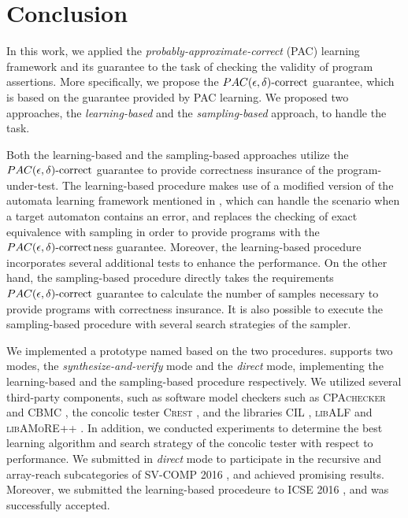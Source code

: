 \chapter{Conclusion}\label{ch:conclusion}

In this work, we applied the \emph{probably-approximate-correct} (PAC) learning framework and its guarantee to the task of checking the validity of program assertions. More specifically, we propose the $PAC(\epsilon, \delta)\text{-correct}$ guarantee, which is based on the guarantee provided by PAC learning. We proposed two approaches, the \emph{learning-based} and the \emph{sampling-based} approach, to handle the task. 

Both the learning-based and the sampling-based approaches utilize the $PAC(\epsilon, \delta)\text{-correct}$ guarantee to provide correctness insurance of the program-under-test. The learning-based procedure makes use of a modified version of the automata learning framework mentioned in \cite{Angluin87}, which can handle the scenario when a target automaton contains an error, and replaces the checking of exact equivalence with sampling in order to provide programs with the $PAC(\epsilon, \delta)\text{-correct}$ness guarantee. Moreover, the learning-based procedure incorporates several additional tests to enhance the performance. On the other hand, the sampling-based procedure directly takes the requirements $PAC(\epsilon, \delta)\text{-correct}$ guarantee to calculate the number of samples necessary to provide programs with correctness insurance. It is also possible to execute the sampling-based procedure with several search strategies of the sampler.

We implemented a prototype named \PACMAN based on the two procedures. \PACMAN supports two modes, the \emph{synthesize-and-verify} mode and the \emph{direct} mode, implementing the learning-based and the sampling-based procedure respectively. We utilized several third-party components, such as software model checkers such as \textsc{CPAchecker} \cite{cpachecker} and CBMC \cite{cbmc}, the concolic tester \textsc{Crest} \cite{crest}, and the libraries CIL \cite{cil}, \textsc{libALF} \cite{libalf} and \textsc{libAMoRE++} \cite{libamore++}. In addition, we conducted experiments to determine the best learning algorithm and search strategy of the concolic tester with respect to performance. We submitted \PACMAN in \emph{direct} mode to participate in the recursive and array-reach subcategories of SV-COMP 2016 \cite{svcomp16}, and achieved promising results. Moreover, we submitted the learning-based procedeure to ICSE 2016 \cite{icse2016}, and was successfully accepted. 

